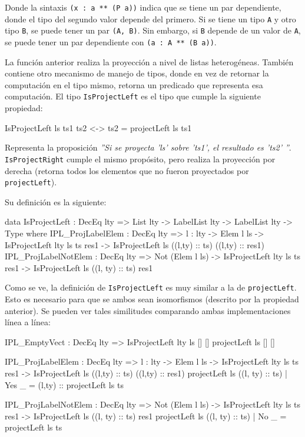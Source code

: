 Donde la sintaxis \texttt{(x : a ** (P a))} indica que se tiene un par dependiente, donde el tipo del segundo valor depende del primero. Si se tiene un tipo \texttt{A} y otro tipo \texttt{B}, se puede tener un par \texttt{(A, B)}. Sin embargo, si \texttt{B} depende de un valor de \texttt{A}, se puede tener un par dependiente con \texttt{(a : A ** (B a))}.

La función anterior realiza la proyección a nivel de listas heterogéneas. También contiene otro mecanismo de manejo de tipos, donde en vez de retornar la computación en el tipo mismo, retorna un predicado que representa esa computación. El tipo \texttt{IsProjectLeft} es el tipo que cumple la siguiente propiedad:

\begin{code}
IsProjectLeft ls ts1 ts2 <-> ts2 = projectLeft ls ts1
\end{code}

Representa la proposición \textit{''Si se proyecta 'ls' sobre 'ts1', el resultado es 'ts2' ''}. \texttt{IsProjectRight} cumple el mismo propósito, pero realiza la proyección por derecha (retorna todos los elementos que no fueron proyectados por \texttt{projectLeft}).

Su definición es la siguiente:

\begin{code}
data IsProjectLeft : DecEq lty => List lty -> LabelList lty ->
  LabelList lty -> Type where
  IPL_ProjLabelElem : DecEq lty => {l : lty} -> 
    Elem l ls -> IsProjectLeft {lty} ls ts res1 ->
    IsProjectLeft ls ((l,ty) :: ts) ((l,ty) :: res1)  
  IPL_ProjLabelNotElem : DecEq lty => Not (Elem l ls) ->
    IsProjectLeft {lty} ls ts res1 ->
    IsProjectLeft ls ((l, ty) :: ts) res1
\end{code}

Como se ve, la definición de \texttt{IsProjectLeft} es muy similar a la de \texttt{projectLeft}. Esto es necesario para que se ambos sean isomorfismos (descrito por la propiedad anterior). Se pueden ver tales similitudes comparando ambas implementaciones línea a línea:

\begin{code}
IPL_EmptyVect : DecEq lty => IsProjectLeft {lty} ls [] []
projectLeft ls [] []

IPL_ProjLabelElem : DecEq lty => {l : lty} -> 
    Elem l ls -> IsProjectLeft {lty} ls ts res1 ->
    IsProjectLeft ls ((l,ty) :: ts) ((l,ty) :: res1)  
projectLeft ls ((l, ty) :: ts) | Yes _ = 
  (l,ty) :: projectLeft ls ts

IPL_ProjLabelNotElem : DecEq lty => Not (Elem l ls) ->
  IsProjectLeft {lty} ls ts res1 ->
  IsProjectLeft ls ((l, ty) :: ts) res1
projectLeft ls ((l, ty) :: ts) | No _ = projectLeft ls ts
\end{code}

